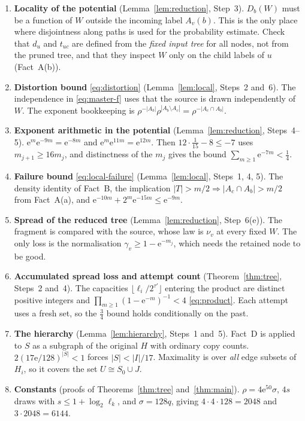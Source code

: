 \documentclass[11pt]{article}
\numberwithin{equation}{section}
\newcommand{\ee}{\mathrm e}
\begin{document}
\begin{enumerate}[leftmargin=2em,itemsep=4pt]
 \item \textbf{Locality of the potential} (Lemma~\ref{lem:reduction},
 Step~3). $D_b(W)$ must be a function of $W$ outside the incoming
 label $A_v(b)$. This is the only place where disjointness along paths
 is used for the probability estimate. Check that $d_u$ and $t_{uc}$
 are defined from the \emph{fixed input tree} for all nodes, not from
 the pruned tree, and that they inspect $W$ only on the child labels
 of $u$ (Fact~A(b)).
 \item \textbf{Distortion bound} \eqref{eq:distortion}
 (Lemma~\ref{lem:local}, Steps~2 and~6). The independence in
 \eqref{eq:master-f} uses that the source is drawn independently of $W$.
 The exponent bookkeeping is
 $\rho^{-|A_b|}\rho^{|A_b\setminus A_c|}=\rho^{-|A_c\cap A_b|}$.
 \item \textbf{Exponent arithmetic in the potential}
 (Lemma~\ref{lem:reduction}, Steps~4--5).
 $\ee^{m}\ee^{-9m}=\ee^{-8m}$ and $\ee^{m}\ee^{11m}=\ee^{12m}$. Then
 $12\cdot\frac1{15}-8\le-7$ uses $m_{j+1}\ge16m_j$, and distinctness
 of the $m_j$ gives the bound $\sum_{m\ge1}\ee^{-7m}<\frac14$.
 \item \textbf{Failure bound} \eqref{eq:local-failure}
 (Lemma~\ref{lem:local}, Steps~1, 4, 5). The density identity of
 Fact~B, the implication
 $|T|>m/2\Rightarrow|A_c\cap A_b|>m/2$ from Fact~A(a), and
 $\ee^{-10m}+2^m\ee^{-15m}\le\ee^{-9m}$.
 \item \textbf{Spread of the reduced tree}
 (Lemma~\ref{lem:reduction}, Step~6(e)). The fragment is compared with
 the source, whose law is $\nu_v$ at every fixed $W$. The only loss is
 the normalisation $\gamma_v\ge1-\ee^{-m_j}$, which needs the retained
 node to be good.
 \item \textbf{Accumulated spread loss and attempt count}
 (Theorem~\ref{thm:tree}, Steps~2 and~4). The capacities
 $\lfloor\ell_i/2^{\tau'}\rfloor$ entering the product are distinct
 positive integers and $\prod_{m\ge1}(1-\ee^{-m})^{-1}<4$
 \eqref{eq:product}. Each attempt uses a fresh set, so the $\frac34$
 bound holds conditionally on the past.
 \item \textbf{The hierarchy} (Lemma~\ref{lem:hierarchy}, Steps~1
 and~5). Fact~D is applied to $S$ as a subgraph of the original $H$
 with ordinary copy counts. $2(17\ee/128)^{|S|}<1$ forces
 $|S|<|I|/17$. Maximality is over \emph{all} edge subsets of $H_i$, so
 it covers the set $U\cong S_0\cup J$.
 \item \textbf{Constants} (proofs of Theorems~\ref{thm:tree}
 and~\ref{thm:main}). $\rho=4\ee^{50}\sigma$, $4s$ draws with
 $s\le1+\log_2\ell_k$, and $\sigma=128q$, giving
 $4\cdot4\cdot128=2048$ and $3\cdot2048=6144$.
\end{enumerate}
\end{document}
